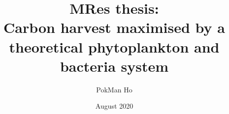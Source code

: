 \documentclass[a4paper,11pt]{article}
\title{MRes thesis:\\Carbon harvest maximised by a theoretical phytoplankton and bacteria system}
\author{PokMan Ho}
\date{August 2020}
\begin{document}
\maketitle











\nocite{*}\printbibliography
\clearpage

\end{document}
